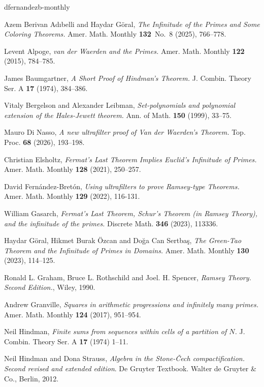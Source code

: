 \documentclass[10pt]{amsart}
\theoremstyle{definition}
\begin{document}
\begin{thebibliography}{dfernandezb-monthly}

Azem Berivan Ad{\i}belli and Haydar G\"oral,
{\em The Infinitude of the Primes and Some Coloring Theorems.}
Amer. Math. Monthly
{\bf 132}~No.~8 (2025), 766--778.

Levent Alpoge,
{\em van der Waerden and the Primes.}
Amer. Math. Monthly
{\bf 122} (2015), 784--785.

James Baumgartner,
{\em A Short Proof of Hindman's Theorem.}
J. Combin. Theory Ser. A
{\bf 17} (1974), 384--386.

Vitaly Bergelson and Alexander Leibman,
{\em Set-polynomials and polynomial extension of the Hales-Jewett theorem.}
Ann. of Math.
{\bf 150} (1999), 33--75.

Mauro Di Nasso,
{\em A new ultrafilter proof of Van der Waerden's Theorem.}
Top. Proc.
{\bf 68} (2026), 193--198.

Christian Elsholtz,
{\em Fermat's Last Theorem Implies Euclid's Infinitude of Primes.}
Amer. Math. Monthly
{\bf 128} (2021), 250--257.

David Fernández-Bretón,
{\em Using ultrafilters to prove Ramsey-type Theorems.}
Amer. Math. Monthly
{\bf 129} (2022), 116-131.

William Gasarch,
{\em Fermat's Last Theorem, Schur's Theorem (in Ramsey Theory), and the infinitude of the primes.}
Discrete Math.
{\bf 346} (2023), 113336.

Haydar G\"oral, Hikmet Burak Özcan and Do\u{g}a Can Sertba\c{s},
{\em The Green-Tao Theorem and the Infinitude of Primes in Domains.}
Amer. Math. Monthly
{\bf 130} (2023), 114--125.

Ronald L. Graham, Bruce L. Rothschild and Joel. H. Spencer,
{\em Ramsey Theory. Second Edition.},
Wiley, 1990.

Andrew Granville,
{\em Squares in arithmetic progressions and infinitely many primes.}
Amer. Math. Monthly
{\bf 124} (2017), 951--954.

Neil Hindman,
{\em Finite sums from sequences within cells of a partition of {$N$}.}
J. Combin. Theory Ser. A
{\bf 17} (1974) 1--11.

Neil Hindman and Dona Strauss,
{\em Algebra in the {S}tone-\v {C}ech compactification. Second revised and extended edition}.
De Gruyter Textbook. Walter de Gruyter \& Co., Berlin, 2012.


\end{thebibliography}
\end{document}
